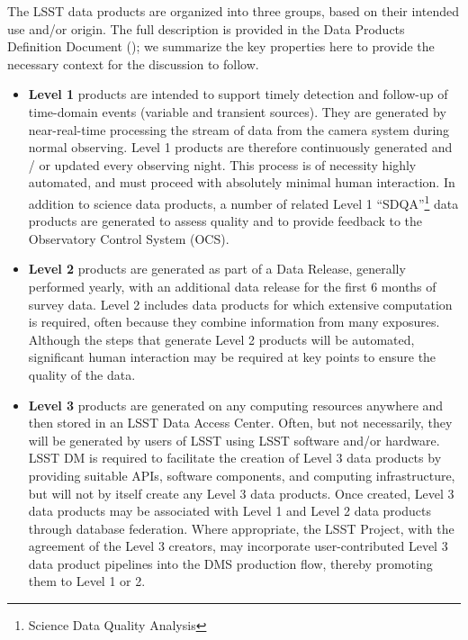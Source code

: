 The LSST data products are organized into three groups, based on their intended use and/or origin. The full description is provided in the Data Products Definition Document (\DPDD); we summarize the key properties here to provide the necessary context for the discussion to follow. 

\begin{itemize}
\item {\bf Level 1} products are intended to support timely detection and follow-up
  of time-domain events (variable and transient sources). They are generated by
  near-real-time processing the stream of data from the camera system during 
  normal observing.  Level 1 products are therefore continuously generated and / or
  updated every observing night. This process is of necessity highly
  automated, and must proceed with absolutely minimal human
  interaction.  In addition to science data products, a number of related
  Level 1 ``SDQA''\footnote{Science Data Quality Analysis} data products are generated
  to assess quality and to provide feedback to the Observatory Control System (OCS).

\item {\bf Level 2} products are generated as part of a Data Release, generally
  performed 
  yearly, with an additional data release for the first 6 months of survey data. 
  Level 2 includes data products for which extensive
  computation is required, often because they combine information from
  many exposures.  Although the steps that generate Level 2 products
  will be automated, significant human interaction may be required at
  key points to ensure the quality of the data.

\item {\bf Level 3} products are generated on any computing resources
  anywhere and then stored in an LSST Data Access Center. Often, but not
  necessarily, they will be generated by users of LSST using LSST software
  and/or hardware. LSST DM is required to facilitate the creation of
  Level 3 data products by providing suitable APIs, software components, and
  computing infrastructure, but will not by itself create any Level 3
  data products. Once created, Level 3 data products may be associated with
  Level 1 and Level 2 data products through database federation.
  Where appropriate, the LSST Project, with the agreement of the Level 3
  creators, may incorporate user-contributed Level 3 data product pipelines
  into the DMS production flow, thereby promoting them to Level 1 or 2.

\end{itemize}

